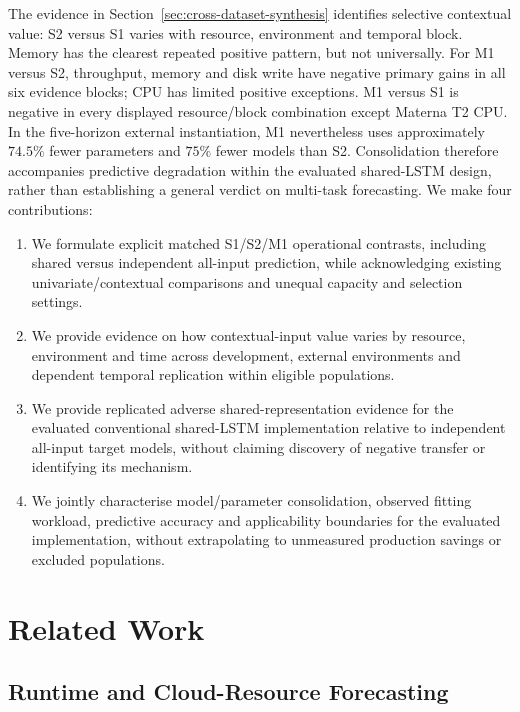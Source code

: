 \documentclass[a4paper,fleqn]{cas-dc}
\begin{document}
The evidence in Section~\ref{sec:cross-dataset-synthesis} identifies selective
contextual value: S2 versus S1 varies with resource, environment and temporal
block. Memory has the clearest repeated positive pattern, but not universally.
For M1 versus S2, throughput, memory and disk write have negative primary gains
in all six evidence blocks; CPU has limited positive exceptions. M1 versus S1
is negative in every displayed resource/block combination except Materna T2
CPU. In the five-horizon external instantiation, M1 nevertheless uses
approximately $74.5\%$ fewer parameters and $75\%$ fewer models than S2.
Consolidation therefore accompanies predictive degradation within the
evaluated shared-LSTM design, rather than establishing a general verdict on
multi-task forecasting. We make four contributions:

\begin{enumerate}
  \item We formulate explicit matched S1/S2/M1 operational contrasts,
    including shared versus independent all-input prediction, while
    acknowledging existing univariate/contextual comparisons and unequal
    capacity and selection settings.
  \item We provide evidence on how contextual-input value varies by resource,
    environment and time across development, external environments and
    dependent temporal replication within eligible populations.
  \item We provide replicated adverse shared-representation evidence for the
    evaluated conventional shared-LSTM implementation relative to independent
    all-input target models, without claiming discovery of negative transfer
    or identifying its mechanism.
  \item We jointly characterise model/parameter consolidation, observed
    fitting workload, predictive accuracy and applicability boundaries for
    the evaluated implementation, without extrapolating to unmeasured
    production savings or excluded populations.
\end{enumerate}

\section{Related Work}
\label{sec:related-work}

\subsection{Runtime and Cloud-Resource Forecasting}
\label{sec:rw-runtime}
\end{document}
